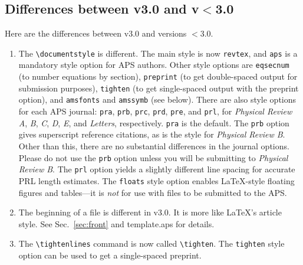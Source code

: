 \subsection{Differences between \REVTeX{} v3.0 and \REVTeX{} v$<$3.0}
\label{sec:2to3}

Here are the differences between \REVTeX{} v3.0 and versions $<$3.0.
\begin{enumerate}
\item The \verb+\documentstyle+ is different. The main style is now
\verb+revtex+, and \verb+aps+ is a mandatory style option for APS
authors. Other
style options are \verb+eqsecnum+ (to number equations by section),
\verb+preprint+ (to get double-spaced output for submission purposes),
\verb+tighten+ (to get single-spaced output with the preprint option),
and \verb+amsfonts+ and \verb+amssymb+ (see below).
There are also style options for each APS journal: \verb+pra+, \verb+prb+,
\verb+prc+, \verb+prd+,
\verb+pre+, and \verb+prl+, for {\it Physical
Review\/} {\it A}, {\it B}, {\it C}, {\it D}, {\it E}, and {\it Letters},
respectively. \verb+pra+ is the default. The \verb+prb+
option gives superscript
reference citations, as is the style for {\it Physical Review B}.
Other than this, there are no substantial differences in the journal options.
Please do not use the \verb+prb+ option unless you
will be submitting to {\it Physical Review B}.
The \verb+prl+ option yields a slightly different line spacing for accurate
PRL length estimates.
The \verb+floats+ style option enables \LaTeX{}-style floating figures and
tables---it is {\it not\/} for use with files to be submitted to the
APS.

\item The beginning of a file is different in v3.0. It is more like \LaTeX{}'s
article style.
See Sec.\ \ref{sec:front} and template.aps for details.

\item The \verb+\tightenlines+ command is now called \verb+\tighten+.
The \verb+tighten+ style option can be used to get a single-spaced
preprint.



\end{enumerate}
